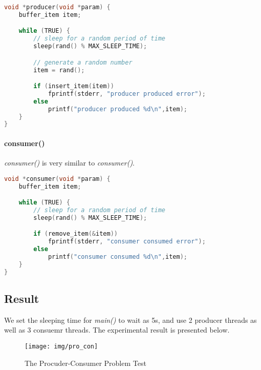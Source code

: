 \documentclass{article}
\begin{document}
\begin{lstlisting}[language=c, caption={producer()}]
void *producer(void *param) {
    buffer_item item;

    while (TRUE) {
        // sleep for a random period of time
        sleep(rand() % MAX_SLEEP_TIME);

        // generate a random number
        item = rand();

        if (insert_item(item))
            fprintf(stderr, "producer produced error");
        else
            printf("producer produced %d\n",item);
    }
}    
\end{lstlisting}

\paragraph{\textbf{consumer()}} \textit{consumer()} is very similar to \textit{consumer()}.

\begin{lstlisting}[language=c, caption={consumer()}]
void *consumer(void *param) {
    buffer_item item;

    while (TRUE) {
        // sleep for a random period of time
        sleep(rand() % MAX_SLEEP_TIME);

        if (remove_item(&item))
            fprintf(stderr, "consumer consumed error");
        else
            printf("consumer consumed %d\n",item);
    }
}
\end{lstlisting}

\subsection*{Result}
We set the sleeping time for \textit{main()} to wait as 5s, and use 2 producer threads as well as 3 consuemr threads. The experimental result is presented below.

\begin{figure}[h]
    \centering
    
    \texttt{[image: img/pro\_con]}
    \caption{The Procuder-Consumer Problem Test}
    \label{}
\end{figure}
\end{document}
